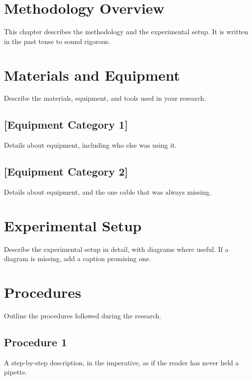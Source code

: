 
\section{Methodology Overview}

This chapter describes the methodology and the experimental setup. It
is written in the past tense to sound rigorous.

\section{Materials and Equipment}

Describe the materials, equipment, and tools used in your research.

\subsection{[Equipment Category 1]}

Details about equipment, including who else was using it.

\subsection{[Equipment Category 2]}

Details about equipment, and the one cable that was always missing.

\section{Experimental Setup}

Describe the experimental setup in detail, with diagrams where useful.
If a diagram is missing, add a caption promising one.

\section{Procedures}

Outline the procedures followed during the research.

\subsection{Procedure 1}

A step-by-step description, in the imperative, as if the reader has
never held a pipette.


